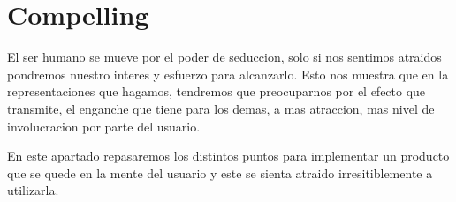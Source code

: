 \newpage
\section{Compelling}
El ser humano se mueve por el poder de seduccion, solo si nos sentimos atraidos pondremos nuestro
interes y esfuerzo para alcanzarlo. Esto nos muestra que en la representaciones que hagamos, tendremos que 
preocuparnos por el efecto que transmite, el enganche que tiene para los demas, a mas atraccion, mas
nivel de involucracion por parte del usuario.

En este apartado repasaremos los distintos puntos para implementar un producto que se quede en la mente
del usuario y este se sienta atraido irresitiblemente a utilizarla.  







